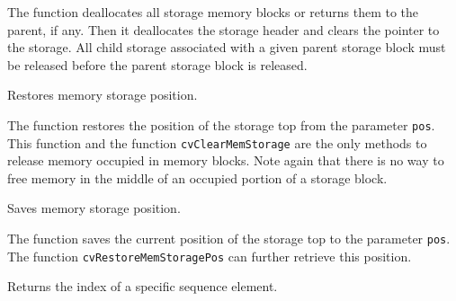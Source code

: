 \begin{description}
\end{description}

The function deallocates all storage memory
blocks or returns them to the parent, if any. Then it deallocates the
storage header and clears the pointer to the storage. All child storage 
associated with a given parent storage block must be released before the 
parent storage block is released.

Restores memory storage position.


\begin{description}
\end{description}

The function restores the position of the storage top from the parameter \texttt{pos}. This function and the function \texttt{cvClearMemStorage} are the only methods to release memory occupied in memory blocks. Note again that there is no way to free memory in the middle of an occupied portion of a storage block.


Saves memory storage position.


\begin{description}
\end{description}

The function saves the current position
of the storage top to the parameter \texttt{pos}. The function
\texttt{cvRestoreMemStoragePos} can further retrieve this position.

Returns the index of a specific sequence element.


